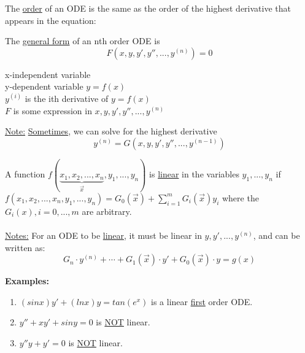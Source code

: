 \begin{definition-N}
	The \underline{order} of an ODE is the same as the order of the highest derivative that appears in the equation:
\end{definition-N}

\begin{definition-N}
	The \underline{general form} of an nth order ODE is 
	\begin{equation*}
		\boxed{F(x, y, y', y'', ..., y^{(n)}) = 0}
	\end{equation*}
	\begin{center}
		x-independent variable\\
	y-dependent variable $y = f(x)$\\
	$y^{(i)}$ is the ith derivative of $y = f(x)$\\
	$F$ is some expression in $x, y, y', y'', ..., y^{(n)}$\\
	\end{center}	
	\underline{Note:} \underline{Sometimes}, we can solve for the highest derivative
	\begin{equation*}
		\boxed{y^{(n)} = G(x, y, y', y'', ..., y^{(n-1)})}
	\end{equation*}
\end{definition-N} 
\redhline
\begin{definition-N}
	A function $f(\underbrace{x_1, x_2, ..., x_n}_{\vec{x}}, y_1, ..., y_n)$ is \underline{linear} in the variables $y_1, ..., y_n$ if \\$f(x_1, x_2, ..., x_n, y_1, ..., y_n) = G_0(\vec{x}) + \sum_{i = 1}^m G_i(\vec{x})y_i$ where the $G_i(x), i=0,...,m$ are arbitrary.\\\\
	\underline{Notes:}  For an ODE to be \underline{linear}, it must be linear in $y, y', ... , y^{(n)}$, and can be written as:
	\begin{equation*}
		\boxed{G_n\cdot y^{(n)} + \cdots + G_1 (\vec{x})\cdot y' + G_0(\vec{x})\cdot y = g(x)}
	\end{equation*}
\end{definition-N}

\textbf{Examples:}
	\begin{enumerate}[label=\protect\circled{\arabic*}]
		\item $(sinx)y' + (lnx)y = tan (e^x)$ is a linear \underline{first} order ODE.
		\item $y'' + xy' + siny = 0$ is \underline{NOT} linear.
		\item $y''y + y' = 0$ is \underline{NOT} linear.
	\end{enumerate}
\redhline

